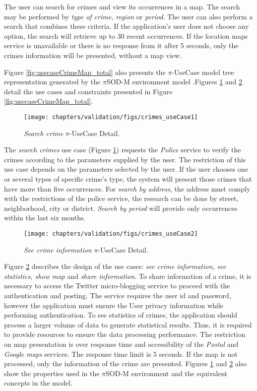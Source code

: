 The user can search for crimes and view its occurrences in a map. The search may be performed by \textit{type of
crime, region} or \textit{period}. The user can also perform a search that
combines these criteria. If the application's user does not choose any
option, the search will retrieve up to 30 recent occurrences. If the location
maps service is unavailable or there is no response from it after 5 seconds,
only the crimes information will be presented, without a map view.


Figure \ref{fig:usecaseCrimeMap_total} also
presents the $\pi$-UseCase model tree representation generated by the $\pi$SOD-M
environment model .Figures \ref{fig:usecaseCrimeMap1} and \ref{fig:usecaseCrimeMap2} detail the
use cases and constraints presented in Figure
\ref{fig:usecaseCrimeMap_total}. 

\begin{figure}[ht!]   
\centering
\texttt{[image: chapters/validation/figs/crimes\_useCase1]}
\caption{\textit{Search crime} $\pi$-UseCase Detail.}
\label{fig:usecaseCrimeMap1}
\end{figure}  

The \textit{search crimes} use case (Figure \ref{fig:usecaseCrimeMap1})
requests the \textit{Police} service to verify the crimes according to the
parameters supplied by the user. The restriction of this use case depends on
the parameters selected by the user. If the user chooses one or several types of
specific crime's type, the system will present those crimes that have more than
five occurrences. For \textit{search by address}, the address must comply with
the restrictions of the police service, the research can be done by street,
neighborhood, city or district. \textit{Search by period} will provide only
occurrences within the last six months.
 
\begin{figure}[ht!]   
\centering
\texttt{[image: chapters/validation/figs/crimes\_useCase2]}
\caption{\textit{See crime information} $\pi$-UseCase Detail.}
\label{fig:usecaseCrimeMap2}
\end{figure}  

Figure \ref{fig:usecaseCrimeMap2} describes the design of the use cases:
\textit{see crime information, see statistics, show map} and \textit{share
information}. To share information of a crime, it is necessary to access the
Twitter micro-blogging service to proceed with the authentication and posting.
The service requires the user id and password, however the
application must ensure the User privacy information while performing
authentication. To see statistics of crimes, the application should process a
larger volume of data to generate statistical results. Thus, it is required to
provide resources to ensure the data processing performance. The restriction on
map presentation is over response time and accessibility of the \textit{Postal}
and \textit{Google maps} services. The response time limit is 5 seconds. If the
map is not processed, only the information of the crime are presented. Figures
\ref{fig:usecaseCrimeMap1} and \ref{fig:usecaseCrimeMap2} also show the
properties used in the $\pi$SOD-M environment and the equivalent concepts in the
model.
 
